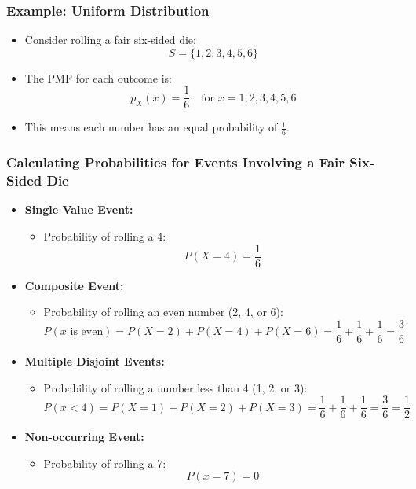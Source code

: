 \documentclass[handout]{beamer} %
\begin{document}
\begin{frame}
\frametitle{Example: Uniform Distribution}
    \begin{itemize}
        \item Consider rolling a fair six-sided die: \pause
        \[
        S = \{1, 2, 3, 4, 5, 6\}
        \] \pause
        \item The PMF for each outcome is: \pause
        \[
        p_X(x) = \frac{1}{6} \quad \text{for } x = 1, 2, 3, 4, 5, 6
        \] \pause
        \item This means each number has an equal probability of \( \frac{1}{6} \).
    \end{itemize}
\end{frame}

\begin{frame}
\frametitle{Calculating Probabilities for Events Involving a Fair Six-Sided Die}
    \begin{itemize}
        \item \textbf{Single Value Event:} \pause
        \begin{itemize}
            \item Probability of rolling a 4: \pause
            \[
            P(X = 4) = \frac{1}{6}
            \]
        \end{itemize}

        \item \textbf{Composite Event:} \pause
        \begin{itemize}
            \item Probability of rolling an even number (2, 4, or 6): \pause
            \[
            P(x \text{ is even}) = P(X = 2) + P(X = 4) + P(X = 6) = \frac{1}{6} + \frac{1}{6} + \frac{1}{6} = \frac{3}{6}
            \]
        \end{itemize}

        \item \textbf{Multiple Disjoint Events:} \pause
        \begin{itemize}
            \item Probability of rolling a number less than 4 (1, 2, or 3): \pause
            \[
            P(x < 4) = P(X = 1) + P(X = 2) + P(X = 3) = \frac{1}{6} + \frac{1}{6} + \frac{1}{6} = \frac{3}{6} = \frac{1}{2}
            \]
        \end{itemize}

        \item \textbf{Non-occurring Event:} \pause
        \begin{itemize}
            \item Probability of rolling a 7: \pause
            \[
            P(x = 7) = 0
            \]
        \end{itemize}
    \end{itemize}
\end{frame}
\end{document}
